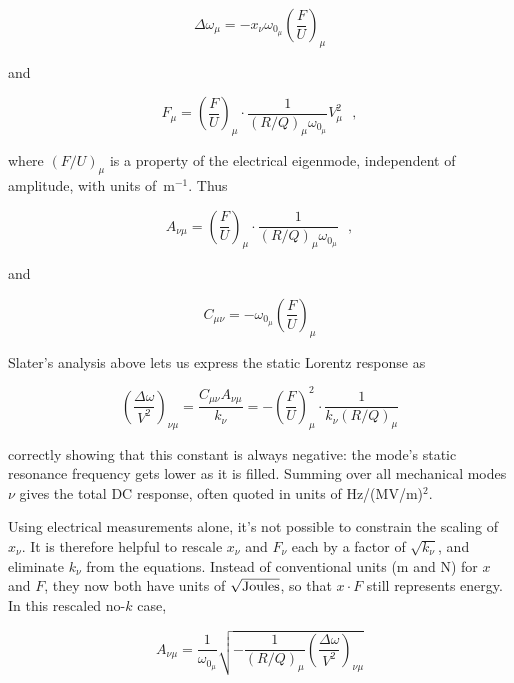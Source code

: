 \documentclass[a4paper,12pt]{article}
\begin{document}
\begin{equation}
\Delta\omega_{\mu} = -x_{\nu}\omega_{0_{\mu}} \left(\frac{F}{U}\right)_{\mu}
\label{eq:delta_omega_mu}
\end{equation}

\noindent and

\begin{equation}
F_{\mu} = \left(\frac{F}{U}\right)_{\mu} \cdot \frac{1}{(R/Q)_{\mu}\omega_{0_{\mu}}}  V_{\mu}^2~~~,
\label{eq:F_mu}
\end{equation}

\noindent where $\left(F/U\right)_{\mu}$ is a property of the electrical eigenmode, independent of amplitude, with units of~\hbox{m$^{-1}$}. Thus

\begin{equation}
A_{\nu\mu} = \left(\frac{F}{U}\right)_{\mu} \cdot \frac{1}{(R/Q)_{\mu}\omega_{0_{\mu}}}~~~,
\end{equation}

\noindent and

\begin{equation}
C_{\mu\nu} = -\omega_{0_{\mu}} \left(\frac{F}{U}\right)_{\mu}
\end{equation}

Slater's analysis above lets us express the static Lorentz response as

\begin{equation}
 \left(\frac{\Delta \omega}{ V^2}\right)_{\nu \mu} = \frac{C_{\mu\nu} A_{\nu\mu}}{ k_\nu} = - \left(\frac{F}{U}\right)_{\mu}^2 \cdot \frac{1}{k_\nu (R/Q)_{\mu}}
\end{equation}

\noindent correctly showing that this constant is always negative: the mode's static resonance frequency gets lower as it is filled. Summing over all mechanical modes $\nu$ gives the total DC response, often quoted in units of \hbox{Hz/(MV/m)$^2$}.

Using electrical measurements alone, it's not possible to constrain the scaling of $x_\nu$. It is therefore helpful to rescale $x_\nu$ and $F_\nu$ each by a factor of $\sqrt{k_\nu}$, and eliminate $k_\nu$ from the equations.  Instead of conventional units (m and N) for $x$ and $F$, they now both have units of $\sqrt{\rm Joules}$, so that $x\cdot F$ still represents energy. In this rescaled no-$k$ case,

\begin{equation}
A_{\nu\mu} = \frac{1}{ \omega_{0_{\mu}}} \sqrt{-\frac{1}{ (R/Q)_{\mu}}  \left(\frac{\Delta \omega}{ V^2}\right)_{\nu \mu}}
\end{equation}
\end{document}
